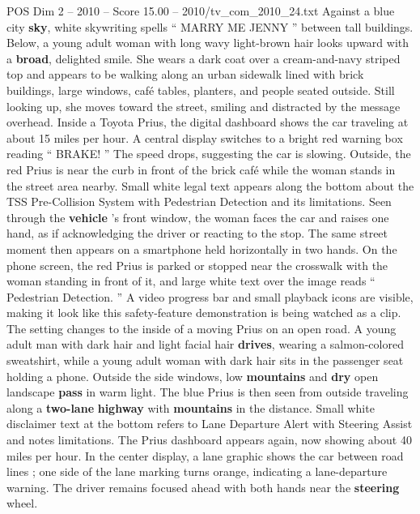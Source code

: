 \begin{textsample}{POS Dim 2 – 2010 – Score 15.00 – 2010/tv\_com\_2010\_24.txt}  \label{ex:f2_pos_054}
Against a blue city \textbf{sky}, white skywriting spells “ MARRY ME JENNY ” between tall buildings.
Below, a young adult woman with long wavy light-brown hair looks upward with a \textbf{broad}, delighted smile.
She wears a dark coat over a cream-and-navy striped top and appears to be walking along an urban sidewalk lined with brick buildings, large windows, café tables, planters, and people seated outside.
Still looking up, she moves toward the street, smiling and distracted by the message overhead.
Inside a Toyota Prius, the digital dashboard shows the car traveling at about 15 miles per hour.
A central display switches to a bright red warning box reading “ BRAKE! ” The speed drops, suggesting the car is slowing.
Outside, the red Prius is near the curb in front of the brick café while the woman stands in the street area nearby.
Small white legal text appears along the bottom about the TSS Pre-Collision System with Pedestrian Detection and its limitations.
Seen through the \textbf{vehicle} ’s front window, the woman faces the car and raises one hand, as if acknowledging the driver or reacting to the stop.
The same street moment then appears on a smartphone held horizontally in two hands.
On the phone screen, the red Prius is parked or stopped near the crosswalk with the woman standing in front of it, and large white text over the image reads “ Pedestrian Detection. ” A video progress bar and small playback icons are visible, making it look like this safety-feature demonstration is being watched as a clip.
The setting changes to the inside of a moving Prius on an open road.
A young adult man with dark hair and light facial hair \textbf{drives}, wearing a salmon-colored sweatshirt, while a young adult woman with dark hair sits in the passenger seat holding a phone.
Outside the side windows, low \textbf{mountains} and \textbf{dry} open landscape \textbf{pass} in warm light.
The blue Prius is then seen from outside traveling along a \textbf{two-lane} \textbf{highway} with \textbf{mountains} in the distance.
Small white disclaimer text at the bottom refers to Lane Departure Alert with Steering Assist and notes limitations.
The Prius dashboard appears again, now showing about 40 miles per hour.
In the center display, a lane graphic shows the car between road lines ; one side of the lane marking turns orange, indicating a lane-departure warning.
The driver remains focused ahead with both hands near the \textbf{steering} wheel.

\end{textsample}
